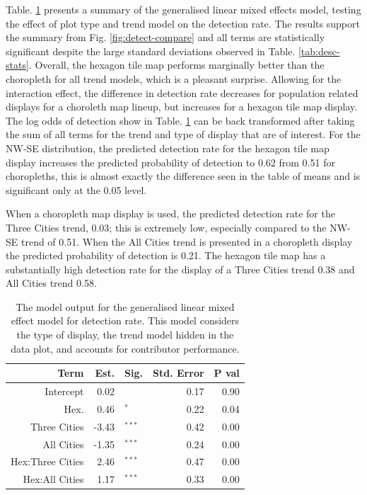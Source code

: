\documentclass[conference,final,]{IEEEtran}
\begin{document}
Table. \ref{tab:detect-glmer1} presents a summary of the generalised linear mixed effects model, testing the effect of plot type and trend model on the detection rate. The results support the summary from Fig. \ref{fig:detect-compare} and all terms are statistically significant despite the large standard deviations observed in Table. \ref{tab:desc-stats}. Overall, the hexagon tile map performs marginally better than the choropleth for all trend models, which is a pleasant surprise. Allowing for the interaction effect, the difference in detection rate decreases for population related displays for a choroleth map lineup, but increases for a hexagon tile map display.
The log odds of detection show in Table. \ref{tab:detect-glmer1} can be back transformed after taking the sum of all terms for the trend and type of display that are of interest.
For the NW-SE distribution, the predicted detection rate for the hexagon tile map display increases the predicted probability of detection to 0.62 from 0.51 for choropleths, this is almost exactly the difference seen in the table of means and is significant only at the 0.05 level.

When a choropleth map display is used, the predicted detection rate for the Three Cities trend, 0.03; this is extremely low, especially compared to the NW-SE trend of 0.51.
When the All Cities trend is presented in a choropleth display the predicted probability of detection is 0.21.
The hexagon tile map has a substantially high detection rate for the display of a Three Cities trend 0.38 and All Cities trend 0.58.

\begin{table}

\caption{\label{tab:detect-glmer1}The model output for the generalised linear mixed effect model for detection rate. This model considers the type of display, the trend model hidden in the data plot, and accounts for contributor performance.}
\centering
\begin{tabular}[t]{rrlrr}
\toprule
Term & Est. & Sig. & Std. Error & P val\\
\midrule
Intercept & 0.02 & $^{ }$ & 0.17 & 0.90\\
Hex. & 0.46 & $^{*}$ & 0.22 & 0.04\\
\addlinespace
Three Cities & -3.43 & $^{***}$ & 0.42 & 0.00\\
All Cities & -1.35 & $^{***}$ & 0.24 & 0.00\\
\addlinespace
Hex:Three Cities & 2.46 & $^{***}$ & 0.47 & 0.00\\
Hex:All Cities & 1.17 & $^{***}$ & 0.33 & 0.00\\
\bottomrule
\end{tabular}
\end{table}
\end{document}
